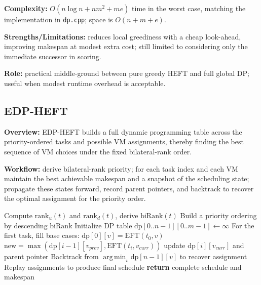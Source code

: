 \documentclass[conference]{IEEEtran}
\DeclareMathOperator*{\argmin}{arg\,min}
\newcommand{\EFT}{\mathrm{EFT}}
\newcommand{\ranku}{\mathrm{rank}_u}
\newcommand{\rankd}{\mathrm{rank}_d}
\begin{document}
\textbf{Complexity:} $O(n\log n + n m^2 + m e)$ time in the worst case,
matching the implementation in \texttt{dp.cpp}; space is $O(n+m+e)$.

\textbf{Strengths/Limitations:} reduces local greediness with a cheap
look-ahead, improving makespan at modest extra cost; still limited to
considering only the immediate successor in scoring.

\textbf{Role:} practical middle-ground between pure greedy HEFT and
full global DP; useful when modest runtime overhead is acceptable.

\subsection{EDP-HEFT}

\textbf{Overview:} EDP-HEFT builds a full dynamic programming table
across the priority-ordered tasks and possible VM assignments, thereby
finding the best sequence of VM choices under the fixed bilateral-rank
order.

\textbf{Workflow:} derive bilateral-rank priority; for each task index
and each VM maintain the best achievable makespan and a snapshot of
the scheduling state; propagate these states forward, record parent
pointers, and backtrack to recover the optimal assignment for the
priority order.

\begin{algorithm}[!t]
\caption{EDP-HEFT (Full Global DP over Priority Order)}
\begin{algorithmic}[1]
\STATE Compute $\ranku(t)$ and $\rankd(t)$, derive $\mathrm{biRank}(t)$
\STATE Build a priority ordering by descending $\mathrm{biRank}$
\STATE Initialize DP table $\mathrm{dp}[0..n-1][0..m-1] \leftarrow \infty$
\STATE For the first task, fill base cases: $\mathrm{dp}[0][v]=\EFT(t_0,v)$
                  \STATE $\mathrm{new} = \max(\mathrm{dp}[i-1][v_{prev}],\EFT(t_i,v_{curr}))$
                        \STATE update $\mathrm{dp}[i][v_{curr}]$ and parent pointer
                  \ENDIF
            \ENDFOR
      \ENDFOR
\ENDFOR
\STATE Backtrack from $\argmin_v \mathrm{dp}[n-1][v]$ to recover assignment
\STATE Replay assignments to produce final schedule
\STATE \textbf{return} complete schedule and makespan
\end{algorithmic}
\end{algorithm}
\end{document}
